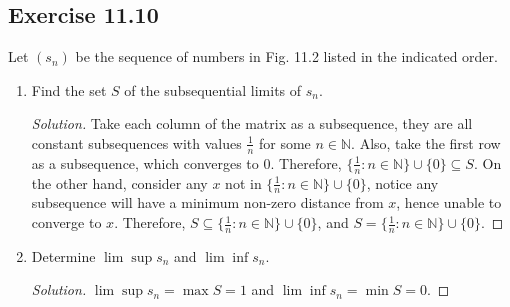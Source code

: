 \documentclass{article}
\begin{document}
\subsection*{Exercise 11.10}
Let $(s_n)$ be the sequence of numbers in Fig. 11.2 listed in the indicated order.
\begin{enumerate}[label=(\alph*)]
    \item Find the set $S$ of the subsequential limits of $s_n$.
    \begin{proof}[Solution]
        Take each column of the matrix as a subsequence, they are all constant subsequences 
        with values $\frac{1}{n}$ for some $n\in\mathbb{N}$. Also, take the first row as a 
        subsequence, which converges to 0.
        Therefore, $\{\frac{1}{n}:n\in\mathbb{N}\} \cup \{0\}\subseteq S$.
        On the other hand, consider any $x$ not in $\{\frac{1}{n}:n\in\mathbb{N}\} \cup \{0\}$, 
        notice any subsequence will have a minimum non-zero distance from $x$, hence unable to 
        converge to $x$. Therefore, $S\subseteq \{\frac{1}{n}:n\in\mathbb{N}\} \cup \{0\}$, and 
        $S=\{\frac{1}{n}:n\in\mathbb{N}\} \cup \{0\}$.
    \end{proof}
    \item Determine $\lim\sup s_n$ and $\lim\inf s_n$.
    \begin{proof}[Solution]
        $\lim\sup s_n=\max S=1$ and $\lim\inf s_n=\min S=0$.
    \end{proof}
\end{enumerate}
\end{document}
